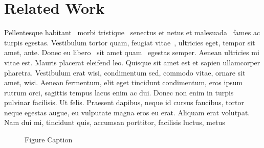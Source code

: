\section{Related Work}
\label{sec:related}

Pellentesque habitant~\cite{8094140,7157818,8416424,8406200} morbi tristique~\cite{8094140} senectus et netus et malesuada~\cite{7157818} fames ac turpis egestas. Vestibulum\cite{181294} tortor quam, feugiat vitae~\cite{8416424}, ultricies eget\cite{8406200}, tempor sit amet, ante\cite{Chen-ASD}. Donec eu libero~\cite{7876241,181294} sit amet quam~\cite{7876241} egestas semper. Aenean\cite{7979979} ultricies mi vitae est. Mauris placerat eleifend leo. Quisque\cite{7899588} sit amet est et sapien ullamcorper\cite{Mu-AAAS} pharetra. Vestibulum erat wisi, condimentum sed\cite{7899588}, commodo vitae, ornare sit amet, wisi. Aenean fermentum, elit eget tincidunt condimentum, eros ipsum rutrum orci, sagittis tempus lacus enim ac dui. Donec non enim in turpis pulvinar facilisis. Ut felis. Praesent dapibus, neque id cursus faucibus, tortor neque egestas augue, eu vulputate magna eros eu erat. Aliquam erat volutpat. Nam dui mi, tincidunt quis, accumsan porttitor, facilisis luctus, metus

\begin{figure}[t!]
	\centering
	\caption{Figure Caption}
	\label{fig:fig2}
\end{figure}